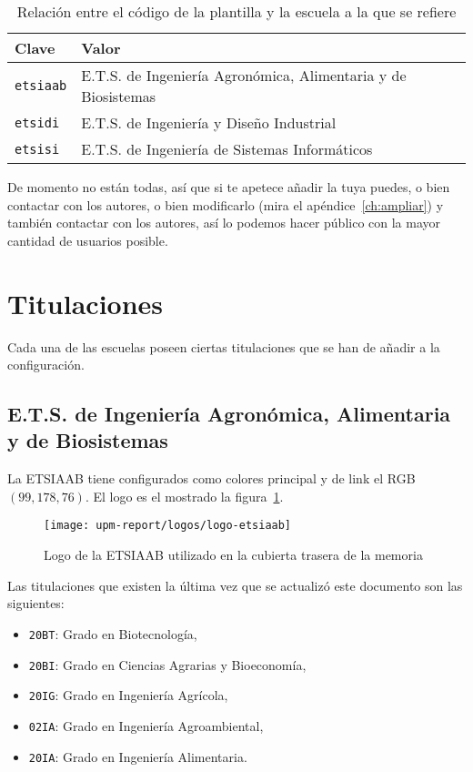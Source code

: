 \documentclass[%
    school=etsisi,%
    type=pfm,%
    degree=MAADM,%
]{upm-report}
\begin{document}
\begin{table}
    \centering
    \begin{tabularx}{\textwidth}{@{}lX@{}}
        \toprule
        \textbf{Clave}   & \textbf{Valor} \\
        \midrule
        \texttt{etsiaab} & E.T.S. de Ingeniería Agronómica, Alimentaria y de Biosistemas \\
        \texttt{etsidi}  & E.T.S. de Ingeniería y Diseño Industrial \\
        \texttt{etsisi}  & E.T.S. de Ingeniería de Sistemas Informáticos \\
        \bottomrule
    \end{tabularx}
    \caption{\label{tbl:schools} Relación entre el código de la plantilla y la escuela a la que se refiere}
\end{table}

De momento no están todas, así que si te apetece añadir la tuya puedes, o bien contactar con los autores, o bien modificarlo (mira el apéndice~\ref{ch:ampliar}) y también contactar con los autores, así lo podemos hacer público con la mayor cantidad de usuarios posible.

\section{Titulaciones}

Cada una de las escuelas poseen ciertas titulaciones que se han de añadir a la configuración.

\subsection{E.T.S. de Ingeniería Agronómica, Alimentaria y de Biosistemas}

La ETSIAAB tiene configurados como colores principal y de link el RGB $(99,178,76)$. El logo es el mostrado la figura~\ref{fig:logo-etsiaab}.

\begin{figure}[ht]
    \centering
    \texttt{[image: upm-report/logos/logo-etsiaab]}
    \caption{\label{fig:logo-etsiaab}Logo de la ETSIAAB utilizado en la cubierta trasera de la memoria}
\end{figure}

Las titulaciones que existen la última vez que se actualizó este documento son las siguientes:

\begin{itemize}
    \item \texttt{20BT}: Grado en Biotecnología,
    \item \texttt{20BI}: Grado en Ciencias Agrarias y Bioeconomía,
    \item \texttt{20IG}: Grado en Ingeniería Agrícola,
    \item \texttt{02IA}: Grado en Ingeniería Agroambiental,
    \item \texttt{20IA}: Grado en Ingeniería Alimentaria.
\end{itemize}
\end{document}
